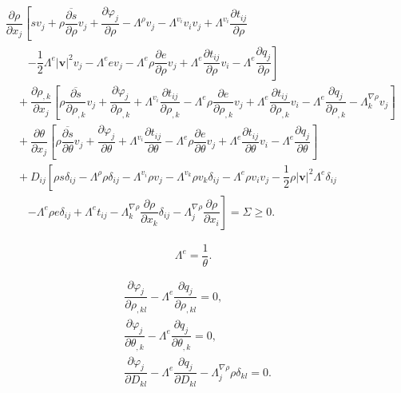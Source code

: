 \documentclass[10pt,a4paper]{amsart}
\begin{document}
\begin{align} \label{osnovna rezidualna nejednakost Kortevegovi fluidi}
	& \dfrac{\partial\rho}{\partial x_j} \left[sv_j+\rho\overline{\dfrac{\partial s}{\partial\rho}}v_j+\dfrac{\partial\varphi_j}{\partial\rho}-\Lambda^\rho v_j-\Lambda^{v_i}v_iv_j+\Lambda^{v_i}\dfrac{\partial t_{ij}}{\partial\rho}
	\right. 
	\nonumber \\  
	& \qquad \left. -\dfrac{1}{2}\Lambda^e|\mathbf{v}|^2v_j -\Lambda^e e v_j-\Lambda^e \rho\dfrac{\partial e}{\partial\rho}v_j+\Lambda^e\dfrac{\partial t_{ij}}{\partial\rho}v_i-\Lambda^e\dfrac{\partial q_j}{\partial\rho}\right] 
	\nonumber \\
	& \quad + \dfrac{\partial\rho_{,k}}{\partial x_j} \left[\rho\overline{\dfrac{\partial s}{\partial\rho_{,k}}}v_j+\dfrac{\partial\varphi_j}{\partial\rho_{,k}}+\Lambda^{v_i}\dfrac{\partial t_{ij}}{\partial\rho_{,k}}-\Lambda^e\rho\dfrac{\partial e}{\partial\rho_{,k}}v_j %
	+ \Lambda^e\dfrac{\partial t_{ij}}{\partial\rho_{,k}}v_i-\Lambda^e\dfrac{\partial q_j}{\partial\rho_{,k}}-\Lambda^{\nabla\rho}_k v_j\right] 
	\\
	& \quad +\dfrac{\partial\theta}{\partial x_j}\left[\rho\overline{\dfrac{\partial s}{\partial\theta}}v_j+\dfrac{\partial\varphi_j}{\partial\theta}+\Lambda^{v_i}\dfrac{\partial t_{ij}}{\partial\theta}-\Lambda^e\rho\dfrac{\partial e}{\partial\theta}v_j+\Lambda^e\dfrac{\partial t_{ij}}{\partial\theta}v_i-\Lambda^e\dfrac{\partial q_j}{\partial\theta}\right] 
	\nonumber \\
	& \quad + D_{ij}\left[\rho s \delta_{ij}-\Lambda^\rho\rho\delta_{ij}-\Lambda^{v_i}\rho v_j-\Lambda^{v_k}\rho v_k\delta_{ij}-\Lambda^e\rho v_i v_j-\dfrac{1}{2}\rho\vert \mathbf{v}\vert^2\Lambda^e\delta_{ij} \right.
	\nonumber \\ 
	& \qquad \left. - \Lambda^e\rho e\delta_{ij} + \Lambda^et_{ij}-\Lambda^{\nabla\rho}_k\dfrac{\partial\rho}{\partial x_k}\delta_{ij}-\Lambda^{\nabla\rho}_j\dfrac{\partial\rho}{\partial x_i} \right] = \Sigma\geq 0. 
	\nonumber 
\end{align}

	\begin{equation} \label{mnozitelj Lambda-e Kortevegovi fluidi}
		\Lambda^{e} = \dfrac{1}{\theta}. 
	\end{equation}

	\begin{align}
		\label{X_jrho_,kl prim Kortevegovi fluidi}
		& \dfrac{\partial\varphi_j}{\partial\rho_{,kl}}-\Lambda^e\dfrac{\partial q_j}{\partial\rho_{,kl}}=0, 
		\\
		\label{X_jtheta_,k prim Kortevegovi fluidi}
		& \dfrac{\partial\varphi_j}{\partial\theta_{,k}}-\Lambda^e\dfrac{\partial q_j}{\partial\theta_{,k}}=0, 
		\\
		\label{X_jD_kl prim Kortevegovi fluidi}
		& \dfrac{\partial\varphi_j}{\partial D_{kl}}-\Lambda^e\dfrac{\partial q_j}{\partial D_{kl}}-\Lambda^{\nabla\rho}_j\rho\delta_{kl}=0.
	\end{align}
\end{document}
